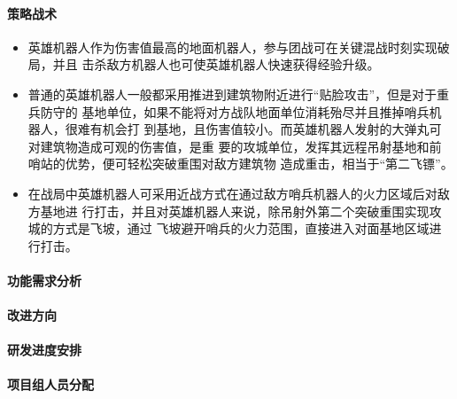     \paragraph{策略战术}


        \begin{itemize}
            \item 英雄机器人作为伤害值最高的地面机器人，参与团战可在关键混战时刻实现破局，并且 击杀敌方机器人也可使英雄机器人快速获得经验升级。
            \item 普通的英雄机器人一般都采用推进到建筑物附近进行“贴脸攻击”，但是对于重兵防守的 基地单位，如果不能将对方战队地面单位消耗殆尽并且推掉哨兵机器人，很难有机会打 到基地，且伤害值较小。而英雄机器人发射的大弹丸可对建筑物造成可观的伤害值，是重 要的攻城单位，发挥其远程吊射基地和前哨站的优势，便可轻松突破重围对敌方建筑物 造成重击，相当于“第二飞镖”。
            \item 在战局中英雄机器人可采用近战方式在通过敌方哨兵机器人的火力区域后对敌方基地进 行打击，并且对英雄机器人来说，除吊射外第二个突破重围实现攻城的方式是飞坡，通过 飞坡避开哨兵的火力范围，直接进入对面基地区域进行打击。
        \end{itemize}
    
    \paragraph{功能需求分析}
    
    \paragraph{改进方向}

    \paragraph{研发进度安排}

    \paragraph{项目组人员分配}
    